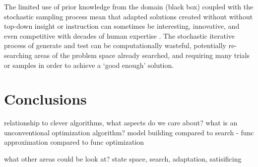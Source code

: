 \documentclass[a4paper, 11pt]{article}
\begin{document}
The limited use of prior knowledge from the domain (black box) coupled with the stochastic sampling process mean that adapted solutions created without without top-down insight or instruction can sometimes be interesting, innovative, and even competitive with decades of human expertise \cite{Koza2003}. The stochastic iterative process of generate and test can be computationally wasteful, potentially re-searching areas of the problem space already searched, and requiring many trials or samples in order to achieve a `good enough' solution.

% 
% 
\section{Conclusions}
\label{sec:conclusions}
relationship to clever algorithms, what aspects do we care about?
what is an unconventional optimization algorithm?
model building compared to search - func approximation compared to func optimization

what other areas could be look at?
state space, search, adaptation, satisificing





\end{document}
